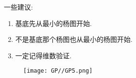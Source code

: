 \documentclass{ctexart}
\begin{document}
一些建议:\begin{enumerate}
    \item 基底先从最小的杨图开始.
    \item 不是基底那个杨图也从最小的杨图开始.
    \item 一定记得维数验证.
\end{enumerate}

\begin{figure}[H]
    \centering
    \texttt{[image: GP//GP5.png]}
\end{figure}
\end{document}
